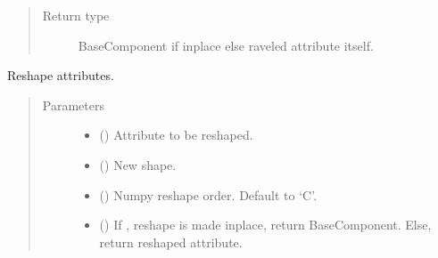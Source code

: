 \documentclass[letterpaper,10pt,english]{sphinxmanual}
\begin{document}
\begin{fulllineitems}
\begin{fulllineitems}
\begin{quote}
\begin{description}
\item[{Return type}] \leavevmode
BaseComponent if inplace else raveled attribute itself.

\end{description}\end{quote}

\end{fulllineitems}


\begin{fulllineitems}
\label{\detokenize{api/tables:geology.src.Tables.reshape}}
Reshape  attributes.
\begin{quote}\begin{description}
\item[{Parameters}] \leavevmode\begin{itemize}
\item {} 
 (\sphinxstyleliteralemphasis{\sphinxupquote{, }}) \textendash{} Attribute to be reshaped.

\item {} 
 () \textendash{} New shape.

\item {} 
 () \textendash{} Numpy reshape order. Default to ‘C’.

\item {} 
 () \textendash{} If , reshape is made inplace, return BaseComponent.
Else, return reshaped attribute.

\end{itemize}


\end{description}
\end{quote}
\end{fulllineitems}
\end{fulllineitems}
\end{document}
